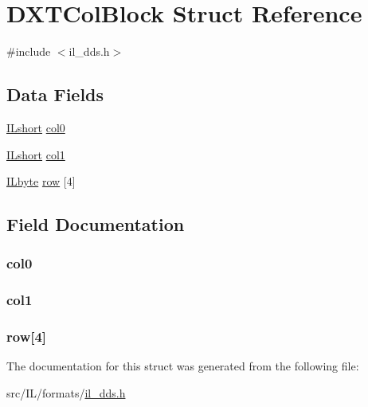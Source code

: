\hypertarget{struct_d_x_t_col_block}{\section{D\-X\-T\-Col\-Block Struct Reference}
\label{struct_d_x_t_col_block}
}


{\ttfamily \#include $<$il\-\_\-dds.\-h$>$}

\subsection*{Data Fields}
\begin{DoxyCompactItemize}
\item 
\hyperlink{il_8h_afc75ded918970afe7517d3f7f0561db3}{I\-Lshort} \hyperlink{struct_d_x_t_col_block_a90d91f957ad0284627f957d2021e8e16}{col0}
\item 
\hyperlink{il_8h_afc75ded918970afe7517d3f7f0561db3}{I\-Lshort} \hyperlink{struct_d_x_t_col_block_af1d888b185c8c9ab89bd7c9ca16966f7}{col1}
\item 
\hyperlink{il_8h_a88e562dacd22f4efcf6f9d31b85d4f92}{I\-Lbyte} \hyperlink{struct_d_x_t_col_block_abd22fcdcf9a1cd6eb9cc54e7f27f0dc2}{row} \mbox{[}4\mbox{]}
\end{DoxyCompactItemize}


\subsection{Field Documentation}
\hypertarget{struct_d_x_t_col_block_a90d91f957ad0284627f957d2021e8e16}{
\subsubsection[{col0}]{ col0}}\label{struct_d_x_t_col_block_a90d91f957ad0284627f957d2021e8e16}
\hypertarget{struct_d_x_t_col_block_af1d888b185c8c9ab89bd7c9ca16966f7}{
\subsubsection[{col1}]{ col1}}\label{struct_d_x_t_col_block_af1d888b185c8c9ab89bd7c9ca16966f7}
\hypertarget{struct_d_x_t_col_block_abd22fcdcf9a1cd6eb9cc54e7f27f0dc2}{
\subsubsection[{row}]{ row\mbox{[}4\mbox{]}}}\label{struct_d_x_t_col_block_abd22fcdcf9a1cd6eb9cc54e7f27f0dc2}


The documentation for this struct was generated from the following file\-:\begin{DoxyCompactItemize}
\item 
src/\-I\-L/formats/\hyperlink{il__dds_8h}{il\-\_\-dds.\-h}\end{DoxyCompactItemize}
